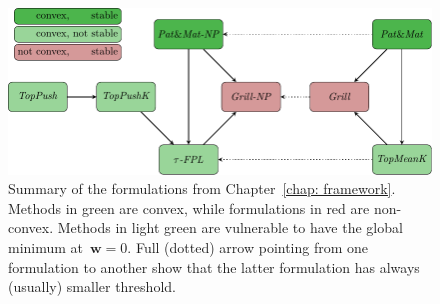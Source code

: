 \begin{figure}[!ht]
  \centering
  \includegraphics[width = \linewidth]{images/methods_relation.pdf}
  \caption{Summary of the formulations from Chapter~\ref{chap: framework}. Methods in green are convex, while formulations in red are non-convex. Methods in light green are vulnerable to have the global minimum at~$\bm{w}=0$. Full (dotted) arrow pointing from one formulation to another show that the latter formulation has always (usually) smaller threshold.}
  \label{fig:thresholds}
\end{figure}